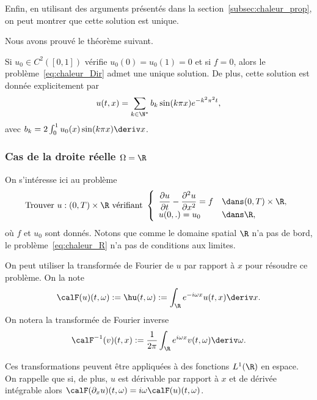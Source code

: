 \documentclass[12pt,a4paper,twoside]{article}
\begin{document}
Enfin, en utilisant des arguments pr\'esent\'es dans la section~\ref{subsec:chaleur_prop},
on peut montrer que cette solution est unique.

Nous avons prouv\'e le th\'eor\`eme suivant.
\begin{theorem}
  Si $u_0 \in C^2([0,1])$ v\'erifie $u_0(0) = u_0(1) = 0$ et si $f=0$,
  alors le probl\`eme~\eqref{eq:chaleur_Dir} admet une unique solution.
  De plus, cette solution est donn\'ee explicitement par
  \begin{align*}
    u(t,x) = \sum_{k\in\N^*} b_k \sin(k \pi x) e^{- k^2 \pi^2 t} ,
  \end{align*}
  avec
  $b_k = 2 \int_{0}^1 u_0(x) \sin(k \pi x) \deriv x$.
\end{theorem}




\subsubsection{Cas de la droite r\'eelle $\Omega = \R$}
\label{subsubsec:chaleur_R}


On s'int\'eresse ici au probl\`eme
\begin{equation}
  \label{eq:chaleur_R}
  \text{Trouver $u : (0,T) \times \R $ v\'erifiant  }
  \left\{
    \begin{array}{l l}
      \dfrac{\partial u}{\partial t} - \dfrac{\partial^2 u}{\partial x^2} = f 
      &\dans (0,T) \times \R ,
      \\
      u(0,.) = u_0 
      & \dans \R ,
    \end{array}
  \right.
\end{equation}
o\`u $f$ et $u_0$ sont donn\'es.
Notons que comme le domaine spatial $\R$ n'a pas de bord, le probl\`eme~\eqref{eq:chaleur_R}
n'a pas de conditions aux limites.


On peut utiliser la transform\'ee de Fourier de $u$ par rapport \`a $x$ 
pour r\'esoudre ce probl\`eme. On la note
\begin{align*}
  \calF(u)(t,\omega) := \hu(t,\omega) := \int_{\R} e^{- i \omega x} u(t,x) \deriv x .
\end{align*}
On notera la transform\'ee de Fourier inverse
\begin{align*}
  \calF^{-1}(v)(t,x) := \dfrac{1}{2\pi} \int_{\R} e^{i \omega x} v(t,\omega) \deriv \omega .
\end{align*}

Ces transformations peuvent \^etre appliqu\'ees \`a des fonctions $L^1(\R)$ en espace.
On rappelle que si, de plus, $u$ est d\'erivable par rapport \`a $x$ et de d\'eriv\'ee
int\'egrable alors $\calF(\partial_x u)(t,\omega) = i \omega \calF(u)(t,\omega)$.
\end{document}
